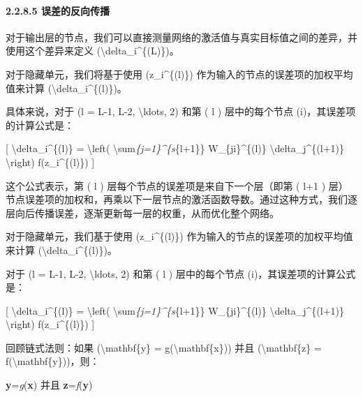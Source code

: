 \paragraph{\texorpdfstring{\textbf{2.2.8.5}
\textbf{误差的反向传播}}{2.2.8.5 误差的反向传播}}\label{2285-ux8befux5deeux7684ux53cdux5411ux4f20ux64ad}

对于输出层的节点，我们可以直接测量网络的激活值与真实目标值之间的差异，并使用这个差异来定义
(\textbackslash delta\_i\^{}\{(L)\})。

对于隐藏单元，我们将基于使用 (z\_i\^{}\{(l)\})
作为输入的节点的误差项的加权平均值来计算
(\textbackslash delta\_i\^{}\{(l)\})。

具体来说，对于 (l = L-1, L-2, \textbackslash ldots, 2) 和第 ( l )
层中的每个节点 (i)，其误差项的计算公式是：

{[} \textbackslash delta\_i\^{}\{(l)\} = \textbackslash left(
\textbackslash sum\emph{\{j=1\}\^{}\{s}\{l+1\}\} W\_\{ji\}\^{}\{(l)\}
\textbackslash delta\_j\^{}\{(l+1)\} \textbackslash right)
f\textquotesingle(z\_i\^{}\{(l)\}) {]}


这个公式表示，第 ( l ) 层每个节点的误差项是来自下一个层（即第 ( l+1 )
层）节点误差项的加权和，再乘以下一层节点的激活函数导数。通过这种方式，我们逐层向后传播误差，逐渐更新每一层的权重，从而优化整个网络。

对于隐藏单元，我们基于使用 (z\_i\^{}\{(l)\})
作为输入的节点的误差项的加权平均值来计算
(\textbackslash delta\_i\^{}\{(l)\})。

对于 (l = L-1, L-2, \textbackslash ldots, 2) 和第 ( l ) 层中的每个节点
(i)，其误差项的计算公式是：

{[} \textbackslash delta\_i\^{}\{(l)\} = \textbackslash left(
\textbackslash sum\emph{\{j=1\}\^{}\{s}\{l+1\}\} W\_\{ji\}\^{}\{(l)\}
\textbackslash delta\_j\^{}\{(l+1)\} \textbackslash right)
f\textquotesingle(z\_i\^{}\{(l)\}) {]}


回顾链式法则：如果 (\textbackslash mathbf\{y\} =
g(\textbackslash mathbf\{x\})) 并且 (\textbackslash mathbf\{z\} =
f(\textbackslash mathbf\{y\}))，则：

\textbf{y}=\emph{g}(\textbf{x}) 并且 \textbf{z}=\emph{f}(\textbf{y})

